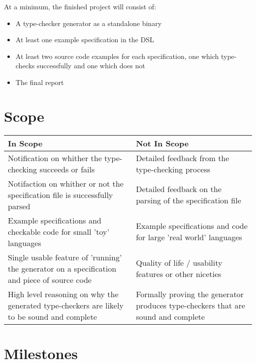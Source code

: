 \documentclass{ProgressReport}[2020/09/15]
\begin{document}
          At a minimum, the finished project will consist of:

          \begin{itemize}
          \item A type-checker generator as a standalone binary
          \item At least one example specification in the DSL
          \item At least two source code examples for each
            specification, one which type-checks successfully and one
            which does not
          \item The final report
          \end{itemize}
          
          \section{Scope}

          \begin{center}
          \begin{tabular}{p{20em}|p{18em}}
            \large In Scope & \large Not In Scope \\ \hline \hline
            Notification on whither the type-checking succeeds
            or fails
            & Detailed feedback from the type-checking process \\ \hline
            Notifaction on whither or not the specification file is
            successfully parsed
            & Detailed feedback on the parsing of the specification file \\ \hline
            Example specifications and checkable code for small 'toy' languages
            & Example specifications and code for large 'real world' languages \\ \hline
            Single usable feature of 'running' the generator on a
            specification and piece of source code
            & Quality of life / usability features or other niceties \\ \hline
            High level reasoning on why the generated type-checkers
            are likely to be sound and complete
            & Formally proving the generator produces type-checkers
            that are sound and complete\\
          \end{tabular}            
          \end{center}        
          
          \section{Milestones}
\end{document}
